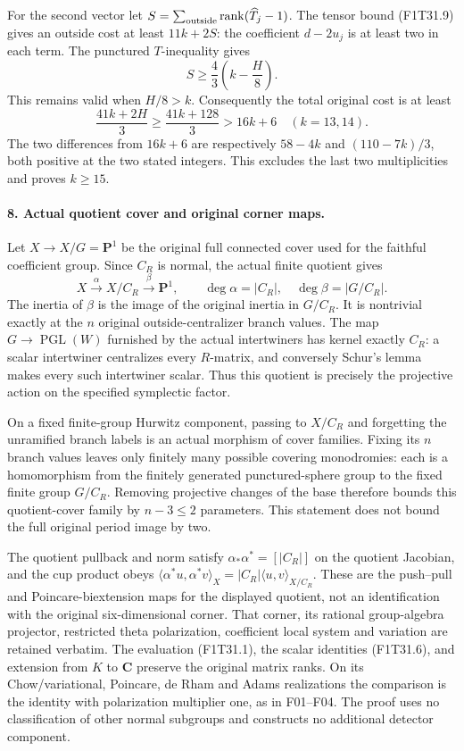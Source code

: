 For the second vector let
\(S=\sum_{\rm outside}\operatorname{rank}(\widehat T_j-1)\).
The tensor bound (F1T31.9) gives an outside cost at least
\(11k+2S\): the coefficient \(d-2u_j\) is at least
two in each term. The punctured \(T\)-inequality gives
\[
                  S\ge\frac43\left(k-\frac H8\right).
\]
This remains valid when \(H/8>k\). Consequently the
total original cost is at least
\[
                  \frac{41k+2H}{3}
                     \ge\frac{41k+128}{3}>16k+6
                   \quad(k=13,14).
 \tag{F1T31.22}
\]
The two differences from \(16k+6\) are respectively
\(58-4k\) and \((110-7k)/3\), both positive at
the two stated integers. This excludes the last two
multiplicities and proves \(k\ge15\).

\paragraph{8. Actual quotient cover and original corner maps.}
Let \(X\to X/G=\mathbf P^1\) be the original full
connected cover used for the faithful coefficient group.
Since \(C_R\) is normal, the actual finite quotient gives
\[
 X\xrightarrow{\alpha}X/C_R
       \xrightarrow{\beta}\mathbf P^1,
 \qquad \deg\alpha=|C_R|,
 \quad\deg\beta=|G/C_R|.
 \tag{F1T31.23}
\]
The inertia of \(\beta\) is the image of the original
inertia in \(G/C_R\). It is nontrivial exactly at the
\(n\) original outside-centralizer branch values.
The map \(G\to\operatorname{PGL}(W)\) furnished by the
actual intertwiners has kernel exactly \(C_R\): a scalar
intertwiner centralizes every \(R\)-matrix, and conversely
Schur's lemma makes every such intertwiner scalar.
Thus this quotient is precisely the projective action
on the specified symplectic factor.

On a fixed finite-group Hurwitz component, passing to
\(X/C_R\) and forgetting the unramified branch labels
is an actual morphism of cover families. Fixing its
\(n\) branch values leaves only finitely many possible
covering monodromies: each is a homomorphism from the
finitely generated punctured-sphere group to the fixed
finite group \(G/C_R\). Removing projective changes
of the base therefore bounds this quotient-cover family
by \(n-3\le2\) parameters. This statement does not
bound the full original period image by two.

The quotient pullback and norm satisfy
\(\alpha_*\alpha^*=[|C_R|]\) on the quotient Jacobian,
and the cup product obeys
\(\langle\alpha^*u,\alpha^*v\rangle_X
 =|C_R|\langle u,v\rangle_{X/C_R}\).
These are the push--pull and Poincare-biextension maps
for the displayed quotient, not an identification with
the original six-dimensional corner. That corner,
its rational group-algebra projector, restricted theta
polarization, coefficient local system and variation
are retained verbatim. The evaluation (F1T31.1),
the scalar identities (F1T31.6), and extension from
\(K\) to \(\mathbf C\) preserve the original matrix
ranks. On its Chow/variational, Poincare, de Rham and
Adams realizations the comparison is the identity with
polarization multiplier one, as in F01--F04. The proof
uses no classification of other normal subgroups and
constructs no additional detector component.
